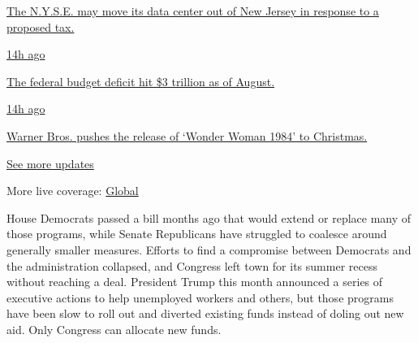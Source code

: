 \href{https://www.nytimes3xbfgragh.onion/live/2020/09/11/business/stock-market-today-coronavirus?action=click\&pgtype=Article\&state=default\&region=MAIN_CONTENT_1\&context=storylines_live_updates\#the-nyse-may-move-its-data-center-out-of-new-jersey-in-response-to-a-proposed-tax}{The
N.Y.S.E. may move its data center out of New Jersey in response to a
proposed tax.}

\href{https://www.nytimes3xbfgragh.onion/live/2020/09/11/business/stock-market-today-coronavirus?action=click\&pgtype=Article\&state=default\&region=MAIN_CONTENT_1\&context=storylines_live_updates\#the-federal-budget-deficit-hit-3-trillion-as-of-august}{14h
ago}

\href{https://www.nytimes3xbfgragh.onion/live/2020/09/11/business/stock-market-today-coronavirus?action=click\&pgtype=Article\&state=default\&region=MAIN_CONTENT_1\&context=storylines_live_updates\#the-federal-budget-deficit-hit-3-trillion-as-of-august}{The
federal budget deficit hit \$3 trillion as of August.}

\href{https://www.nytimes3xbfgragh.onion/live/2020/09/11/business/stock-market-today-coronavirus?action=click\&pgtype=Article\&state=default\&region=MAIN_CONTENT_1\&context=storylines_live_updates\#warner-bros-pushes-the-release-of-wonder-woman-1984-to-christmas}{14h
ago}

\href{https://www.nytimes3xbfgragh.onion/live/2020/09/11/business/stock-market-today-coronavirus?action=click\&pgtype=Article\&state=default\&region=MAIN_CONTENT_1\&context=storylines_live_updates\#warner-bros-pushes-the-release-of-wonder-woman-1984-to-christmas}{Warner
Bros. pushes the release of `Wonder Woman 1984' to Christmas.}

\href{https://www.nytimes3xbfgragh.onion/live/2020/09/11/business/stock-market-today-coronavirus?action=click\&pgtype=Article\&state=default\&region=MAIN_CONTENT_1\&context=storylines_live_updates}{See
more updates}

More live coverage:
\href{https://www.nytimes3xbfgragh.onion/2020/09/11/world/covid-19-coronavirus.html?action=click\&pgtype=Article\&state=default\&region=MAIN_CONTENT_1\&context=storylines_live_updates}{Global}

House Democrats passed a bill months ago that would extend or replace
many of those programs, while Senate Republicans have struggled to
coalesce around generally smaller measures. Efforts to find a compromise
between Democrats and the administration collapsed, and Congress left
town for its summer recess without reaching a deal. President Trump this
month announced a series of executive actions to help unemployed workers
and others, but those programs have been slow to roll out and diverted
existing funds instead of doling out new aid. Only Congress can allocate
new funds.

